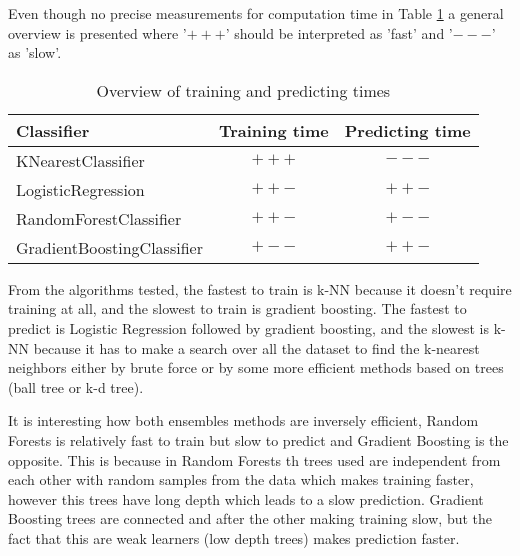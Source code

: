 Even though no precise measurements for computation time in Table \ref{table:times} a general overview is presented where '$+++$' should be interpreted as 'fast' and '$---$' as 'slow'.

\begin{table}[h!]
	\centering
	\caption{Overview of training and predicting times}
	\begin{tabular}{| l | c | c |}
		\hline
		\textbf{Classifier} & \textbf{Training time} & \textbf{Predicting time}\\
		\hline
		KNearestClassifier & $+++$ & $---$ \\ \hline
		LogisticRegression & $++-$ & $++-$ \\ \hline
		RandomForestClassifier & $++-$ & $+--$ \\ \hline
		GradientBoostingClassifier & $+--$ & $++-$ \\ \hline
	\end{tabular}
	\label{table:times}
\end{table}

From the algorithms tested, the fastest to train is k-NN because it doesn't require training at all, and the slowest to train is gradient boosting. The fastest to predict is Logistic Regression followed by gradient boosting, and the slowest is k-NN because it has to make a search over all the dataset to find the k-nearest neighbors either by brute force or by some more efficient methods based on trees (ball tree or k-d tree).

It is interesting how both ensembles methods are inversely efficient, Random Forests is relatively fast to train but slow to predict and Gradient Boosting is the opposite. This is because in Random Forests th trees used are independent from each other with random samples from the data which makes training faster, however this trees have long depth which leads to a slow prediction. Gradient Boosting trees are connected and after the other making training slow, but the fact that this are weak learners (low depth trees) makes prediction faster. 